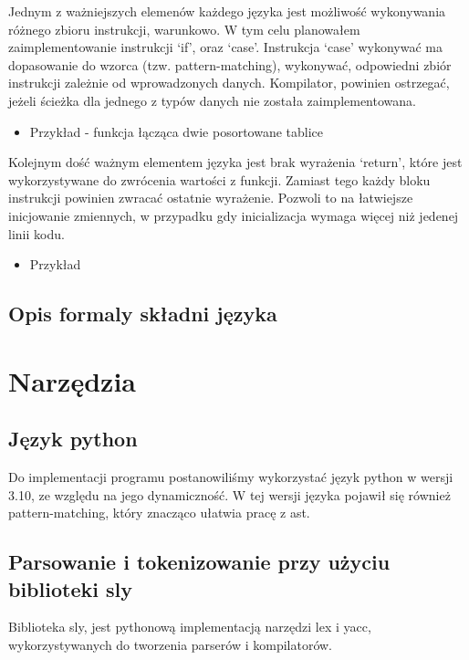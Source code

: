 \documentclass{article}
\begin{document}
Jednym z ważniejszych elemenów każdego języka jest możliwość wykonywania różnego zbioru instrukcji, warunkowo. W tym celu planowałem zaimplementowanie instrukcji `if', oraz `case'. Instrukcja `case' wykonywać ma dopasowanie do wzorca (tzw. pattern-matching), wykonywać, odpowiedni zbiór instrukcji zależnie od wprowadzonych danych. Kompilator, powinien ostrzegać, jeżeli ścieżka dla jednego z typów danych nie została zaimplementowana.

\begin{itemize}
  \newpage
  \item Przykład - funkcja łącząca dwie posortowane tablice
        
        
\end{itemize}

\newpage
Kolejnym dość ważnym elementem języka jest brak wyrażenia `return', które jest wykorzystywane do zwrócenia wartości z funkcji. Zamiast tego każdy bloku instrukcji powinien zwracać ostatnie wyrażenie. Pozwoli to na łatwiejsze inicjowanie zmiennych, w przypadku gdy inicializacja wymaga więcej niż jedenej linii kodu.


\begin{itemize}
  \item Przykład
        
        
\end{itemize}
\subsection{Opis formaly składni języka}
\section{Narzędzia}
\subsection{Język python}
Do implementacji programu postanowiliśmy wykorzystać język python w wersji 3.10, ze względu na jego dynamiczność.
W tej wersji języka pojawił się również pattern-matching, który znacząco ułatwia pracę z ast.
\subsection{Parsowanie i tokenizowanie przy użyciu biblioteki sly}
Biblioteka sly, jest pythonową implementacją narzędzi lex i yacc, wykorzystywanych do tworzenia parserów i kompilatorów.
\end{document}
